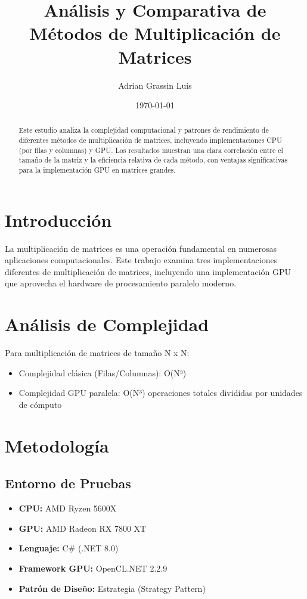 \documentclass[11pt]{article}
\begin{document}
\title{Análisis y Comparativa de Métodos de Multiplicación de Matrices}
\author{Adrian Grassin Luis}
\date{\today}
\maketitle

\begin{abstract}
Este estudio analiza la complejidad computacional y patrones de rendimiento de diferentes métodos de multiplicación de matrices, incluyendo implementaciones CPU (por filas y columnas) y GPU. Los resultados muestran una clara correlación entre el tamaño de la matriz y la eficiencia relativa de cada método, con ventajas significativas para la implementación GPU en matrices grandes.
\end{abstract}

\section{Introducción}
La multiplicación de matrices es una operación fundamental en numerosas aplicaciones computacionales. Este trabajo examina tres implementaciones diferentes de multiplicación de matrices, incluyendo una implementación GPU que aprovecha el hardware de procesamiento paralelo moderno.

\section{Análisis de Complejidad}
Para multiplicación de matrices de tamaño N x N:
\begin{itemize}
    \item Complejidad clásica (Filas/Columnas): O(N³)
    \item Complejidad GPU paralela: O(N³) operaciones totales divididas por unidades de cómputo
\end{itemize}

\section{Metodología}
\subsection{Entorno de Pruebas}
\begin{itemize}
    \item \textbf{CPU:} AMD Ryzen 5600X
    \item \textbf{GPU:} AMD Radeon RX 7800 XT
    \item \textbf{Lenguaje:} C\# (.NET 8.0)
    \item \textbf{Framework GPU:} OpenCL.NET 2.2.9
    \item \textbf{Patrón de Diseño:} Estrategia (Strategy Pattern)
\end{itemize}
\end{document}

